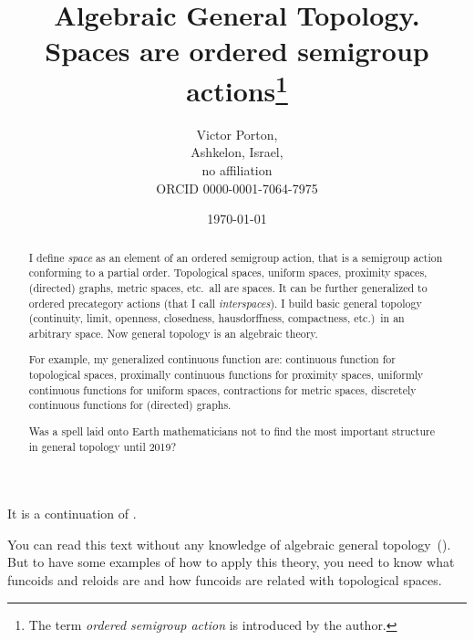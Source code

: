 \documentclass[english,reqno,12pt]{amsbook}
\begin{document}
\title{Algebraic General Topology. Spaces are ordered semigroup actions\footnote{The term \emph{ordered semigroup action} is introduced by the author.}}

\author{Victor Porton,\\Ashkelon, Israel,\\no affiliation\\ORCID 0000-0001-7064-7975}



\date{\today}

\begin{abstract}
I define \emph{space} as an element of an ordered semigroup action, that is a semigroup action conforming to a partial order. Topological spaces, uniform spaces, proximity spaces, (directed) graphs, metric spaces, etc.\ all are spaces. It can be further generalized to ordered precategory actions (that I call \emph{interspaces}). I build basic general topology (continuity, limit, openness, closedness, hausdorffness, compactness, etc.)\ in an arbitrary space. Now general topology is an algebraic theory.

For example, my generalized continuous function are: continuous function for topological spaces, proximally continuous functions for proximity spaces, uniformly continuous functions for uniform spaces, contractions for metric spaces, discretely continuous functions for (directed) graphs.

Was a spell laid onto Earth mathematicians not to find the most important structure in general topology until 2019?
\end{abstract}





\maketitle

\tableofcontents{}

It is a continuation of \cite{volume-1-edition1}.

You can read this text without any knowledge of algebraic general topology~(\cite{volume-1-edition1}). But to have some examples of how to apply this theory, you need to know what funcoids and reloids are and how funcoids are related with topological spaces.






\end{document}
